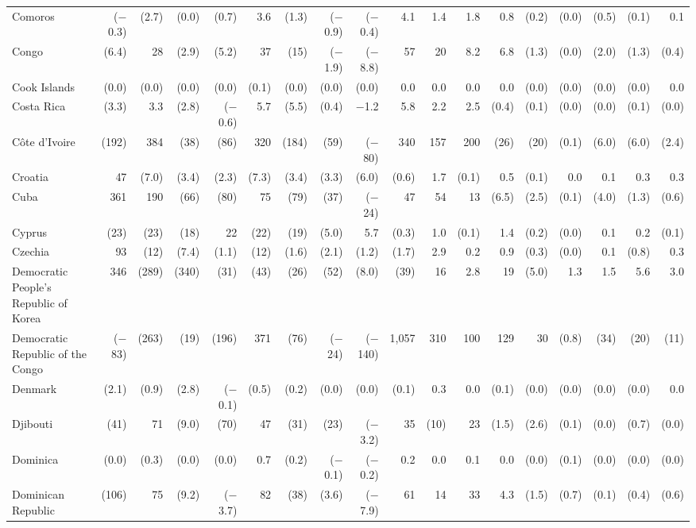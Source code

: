 \begin{longtable}{lrrrrrrrrrrrrrrrrr}
Comoros & ($-$0.3) & (2.7) & (0.0) & (0.7) & 3.6 & (1.3) & ($-$0.9) & ($-$0.4) & 4.1 & 1.4 & 1.8 & 0.8 & (0.2) & (0.0) & (0.5) & (0.1) & 0.1 \\
Congo & (6.4) & 28 & (2.9) & (5.2) & 37 & (15) & ($-$1.9) & ($-$8.8) & 57 & 20 & 8.2 & 6.8 & (1.3) & (0.0) & (2.0) & (1.3) & (0.4) \\
Cook Islands & (0.0) & (0.0) & (0.0) & (0.0) & (0.1) & (0.0) & (0.0) & (0.0) & 0.0 & 0.0 & 0.0 & 0.0 & (0.0) & (0.0) & (0.0) & (0.0) & 0.0 \\
Costa Rica & (3.3) & 3.3 & (2.8) & ($-$0.6) & 5.7 & (5.5) & (0.4) & $-$1.2 & 5.8 & 2.2 & 2.5 & (0.4) & (0.1) & (0.0) & (0.0) & (0.1) & (0.0) \\
Côte d'Ivoire & (192) & 384 & (38) & (86) & 320 & (184) & (59) & ($-$80) & 340 & 157 & 200 & (26) & (20) & (0.1) & (6.0) & (6.0) & (2.4) \\
Croatia & 47 & (7.0) & (3.4) & (2.3) & (7.3) & (3.4) & (3.3) & (6.0) & (0.6) & 1.7 & (0.1) & 0.5 & (0.1) & 0.0 & 0.1 & 0.3 & 0.3 \\
Cuba & 361 & 190 & (66) & (80) & 75 & (79) & (37) & ($-$24) & 47 & 54 & 13 & (6.5) & (2.5) & (0.1) & (4.0) & (1.3) & (0.6) \\
Cyprus & (23) & (23) & (18) & 22 & (22) & (19) & (5.0) & 5.7 & (0.3) & 1.0 & (0.1) & 1.4 & (0.2) & (0.0) & 0.1 & 0.2 & (0.1) \\
Czechia & 93 & (12) & (7.4) & (1.1) & (12) & (1.6) & (2.1) & (1.2) & (1.7) & 2.9 & 0.2 & 0.9 & (0.3) & (0.0) & 0.1 & (0.8) & 0.3 \\
Democratic People's Republic of Korea & 346 & (289) & (340) & (31) & (43) & (26) & (52) & (8.0) & (39) & 16 & 2.8 & 19 & (5.0) & 1.3 & 1.5 & 5.6 & 3.0 \\
Democratic Republic of the Congo & ($-$83) & (263) & (19) & (196) & 371 & (76) & ($-$24) & ($-$140) & 1,057 & 310 & 100 & 129 & 30 & (0.8) & (34) & (20) & (11) \\
Denmark & (2.1) & (0.9) & (2.8) & ($-$0.1) & (0.5) & (0.2) & (0.0) & (0.0) & (0.1) & 0.3 & 0.0 & (0.1) & (0.0) & (0.0) & (0.0) & (0.0) & 0.0 \\
Djibouti & (41) & 71 & (9.0) & (70) & 47 & (31) & (23) & ($-$3.2) & 35 & (10) & 23 & (1.5) & (2.6) & (0.1) & (0.0) & (0.7) & (0.0) \\
Dominica & (0.0) & (0.3) & (0.0) & (0.0) & 0.7 & (0.2) & ($-$0.1) & ($-$0.2) & 0.2 & 0.0 & 0.1 & 0.0 & (0.0) & (0.1) & (0.0) & (0.0) & (0.0) \\
Dominican Republic & (106) & 75 & (9.2) & ($-$3.7) & 82 & (38) & (3.6) & ($-$7.9) & 61 & 14 & 33 & 4.3 & (1.5) & (0.7) & (0.1) & (0.4) & (0.6) \\

\end{longtable}
